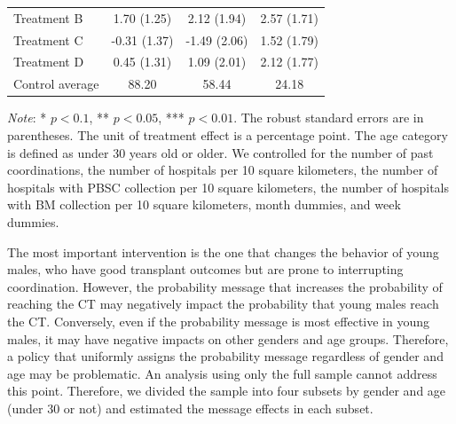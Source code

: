 \documentclass [12pt, a4paper]{article}
\begin{document}
\begin{table}
\begin{threeparttable}
\begin{tabular}[t]{lccc}
\hspace{1em}Treatment B & 1.70 (1.25) & 2.12 (1.94) & 2.57 (1.71)\\
\hspace{1em}Treatment C & -0.31 (1.37) & -1.49 (2.06) & 1.52 (1.79)\\
\hspace{1em}Treatment D & 0.45 (1.31) & 1.09 (2.01) & 2.12 (1.77)\\
\hspace{1em}Control average & 88.20 & 58.44 & 24.18\\
\bottomrule
\end{tabular}
\begin{tablenotes}
\item \emph{Note}: * $p < 0.1$, ** $p < 0.05$, *** $p < 0.01$. The robust standard errors are in parentheses. The unit of treatment effect is a percentage point. The age category is defined as under 30 years old or older. We controlled for the number of past coordinations, the number of hospitals per 10 square kilometers, the number of hospitals with PBSC collection per 10 square kilometers, the number of hospitals with BM collection per 10 square kilometers, month dummies, and week dummies.
\end{tablenotes}
\end{threeparttable}
\end{table}

The most important intervention is the one that changes the behavior of young males, who have good transplant outcomes but are prone to interrupting coordination. However, the probability message that increases the probability of reaching the CT may negatively impact the probability that young males reach the CT. Conversely, even if the probability message is most effective in young males, it may have negative impacts on other genders and age groups. Therefore, a policy that uniformly assigns the probability message regardless of gender and age may be problematic. An analysis using only the full sample cannot address this point. Therefore, we divided the sample into four subsets by gender and age (under 30 or not) and estimated the message effects in each subset.
\end{document}

